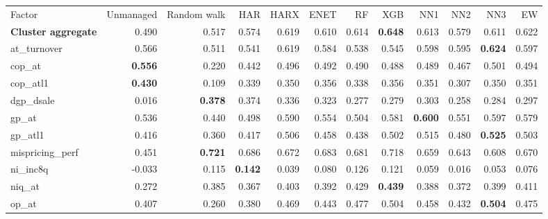 \begin{landscape}
\begin{longtable}{>{\raggedright\arraybackslash}p{2.6cm}rrrrrrrrrrr}
\hline
\multicolumn{12}{@{}l}{\textit{Panel I. Quality}} \\
\hline
Factor & Unmanaged & Random walk & HAR & HARX & ENET & RF & XGB & NN1 & NN2 & NN3 & EW \\
\hline
\textbf{Cluster aggregate} & 0.490 & 0.517 & \cellcolor{blue!10}0.574 & \cellcolor{blue!10}0.619 & \cellcolor{blue!10}0.610 & \cellcolor{blue!10}0.614 & \textbf{\cellcolor{blue!10}0.648} & \cellcolor{blue!10}0.613 & \cellcolor{blue!10}0.579 & \cellcolor{blue!10}0.611 & \cellcolor{blue!10}0.622 \\
at\_turnover & 0.566 & 0.511 & 0.541 & \cellcolor{blue!10}0.619 & \cellcolor{blue!10}0.584 & 0.538 & 0.545 & \cellcolor{blue!10}0.598 & \cellcolor{blue!10}0.595 & \textbf{\cellcolor{blue!10}0.624} & \cellcolor{blue!10}0.597 \\
cop\_at & \textbf{0.556} & 0.220 & 0.442 & 0.496 & 0.492 & 0.490 & 0.488 & 0.489 & 0.467 & 0.501 & 0.494 \\
cop\_atl1 & \textbf{0.430} & 0.109 & 0.339 & 0.350 & 0.356 & 0.338 & 0.356 & 0.351 & 0.307 & 0.350 & 0.351 \\
dgp\_dsale & 0.016 & \textbf{0.378} & 0.374 & 0.336 & 0.323 & 0.277 & 0.279 & 0.303 & 0.258 & 0.284 & 0.297 \\
gp\_at & 0.536 & 0.440 & 0.498 & \cellcolor{blue!10}0.590 & \cellcolor{blue!10}0.554 & 0.504 & \cellcolor{blue!10}0.581 & \textbf{\cellcolor{blue!10}0.600} & \cellcolor{blue!10}0.551 & \cellcolor{blue!10}0.597 & \cellcolor{blue!10}0.579 \\
gp\_atl1 & 0.416 & 0.360 & \cellcolor{blue!10}0.417 & \cellcolor{blue!10}0.506 & \cellcolor{blue!10}0.458 & \cellcolor{blue!10}0.438 & \cellcolor{blue!10}0.502 & \cellcolor{blue!10}0.515 & \cellcolor{blue!10}0.480 & \textbf{\cellcolor{blue!10}0.525} & \cellcolor{blue!10}0.503 \\
mispricing\_perf & 0.451 & \textbf{0.721} & 0.686 & 0.672 & 0.683 & 0.681 & 0.718 & 0.659 & 0.643 & 0.608 & 0.670 \\
ni\_inc8q & -0.033 & 0.115 & \textbf{\cellcolor{blue!10}0.142} & 0.039 & 0.080 & \cellcolor{blue!10}0.126 & \cellcolor{blue!10}0.121 & 0.059 & 0.016 & 0.053 & 0.076 \\
niq\_at & 0.272 & 0.385 & 0.367 & \cellcolor{blue!10}0.403 & \cellcolor{blue!10}0.392 & \cellcolor{blue!10}0.429 & \textbf{\cellcolor{blue!10}0.439} & \cellcolor{blue!10}0.388 & 0.372 & \cellcolor{blue!10}0.399 & \cellcolor{blue!10}0.411 \\
op\_at & 0.407 & 0.260 & 0.380 & \cellcolor{blue!10}0.469 & \cellcolor{blue!10}0.443 & \cellcolor{blue!10}0.477 & \cellcolor{blue!10}0.504 & \cellcolor{blue!10}0.458 & \cellcolor{blue!10}0.432 & \textbf{\cellcolor{blue!10}0.504} & \cellcolor{blue!10}0.475 \\

\end{longtable}
\end{landscape}
